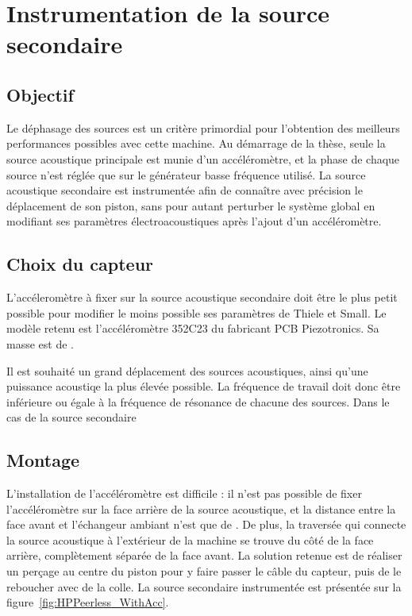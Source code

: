 \chapter{Instrumentation de la source secondaire}\label{chap:InstrumHP}
\section{Objectif}
Le déphasage des sources est un critère primordial pour l'obtention des meilleurs performances possibles avec cette machine. Au démarrage de la thèse, seule la source acoustique principale est munie d'un accéléromètre, et la phase de chaque source n'est réglée que sur le générateur basse fréquence utilisé. La source acoustique secondaire est instrumentée afin de connaître avec précision le déplacement de son piston, sans pour autant perturber le système global en modifiant ses paramètres électroacoustiques après l'ajout d'un accéléromètre.

\section{Choix du capteur}
L'accéleromètre à fixer sur la source acoustique secondaire doit être le plus petit possible pour modifier le moins possible ses paramètres de Thiele et Small. Le modèle retenu est l'accéléromètre 352C23 du fabricant PCB Piezotronics. Sa masse est de . 

Il est souhaité un grand déplacement des sources acoustiques, ainsi qu'une puissance acoustiqe la plus élevée possible. La fréquence de travail doit donc être inférieure ou égale à la fréquence de résonance de chacune des sources. Dans le cas de la source secondaire 


\section{Montage}
L'installation de l'accéléromètre est difficile : il n'est pas possible de fixer l'accéléromètre sur la face arrière de la source acoustique, et la distance entre la face avant et l'échangeur ambiant n'est que de . De plus, la traversée qui connecte la source acoustique à l'extérieur de la machine se trouve du côté de la face arrière, complètement séparée de la face avant. La solution retenue est de réaliser un perçage au centre du piston pour y faire passer le câble du capteur, puis de le reboucher avec de la colle. La source secondaire instrumentée est présentée sur la figure~\ref{fig:HPPeerless_WithAcc}.

